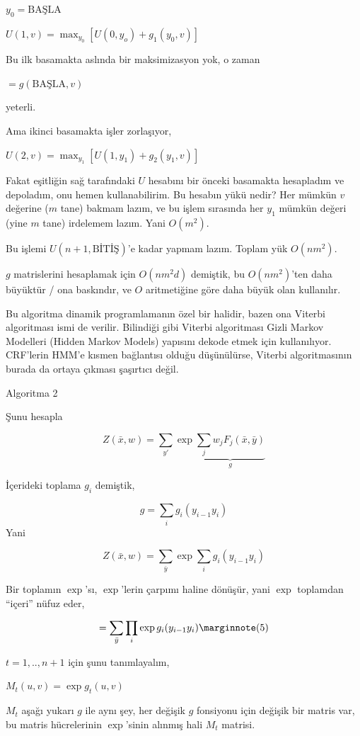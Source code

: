 \documentclass[12pt,fleqn]{article}\usepackage{../../common}
\begin{document}
$y_0 = \textrm{BAŞLA}$

$U(1,v) = \max_{y_0} [ U(0,y_o) + g_1(y_0,v)]$

Bu ilk basamakta aslında bir maksimizasyon yok, o zaman 

$ = g(\textrm{BAŞLA},v)$

yeterli. 

Ama ikinci basamakta işler zorlaşıyor, 

$U(2,v) = \max_{y_1} [ U(1,y_1) + g_2(y_1,v) ]$

Fakat eşitliğin sağ tarafındaki $U$ hesabını bir önceki basamakta
hesapladım ve depoladım, onu hemen kullanabilirim. Bu hesabın yükü nedir? 
Her mümkün $v$ değerine ($m$ tane) bakmam lazım, ve bu işlem sırasında her
$y_1$ mümkün değeri (yine $m$ tane) irdelemem lazım. Yani $O(m^2)$. 

Bu işlemi $U(n+1, \textrm{BİTİŞ})$'e kadar yapmam lazım. Toplam yük $O(nm^2)$. 

$g$ matrislerini hesaplamak için $O(nm^2d)$ demiştik, bu  $O(nm^2)$'ten
daha büyüktür / ona baskındır, ve $O$ aritmetiğine göre daha büyük olan 
kullanılır. 

Bu algoritma dinamik programlamanın özel bir halidir, bazen ona Viterbi
algoritması ismi de verilir. Bilindiği gibi Viterbi algoritması Gizli
Markov Modelleri (Hidden Markov Models) yapısını dekode etmek için
kullanılıyor. CRF'lerin HMM'e kısmen bağlantısı olduğu düşünülürse, Viterbi
algoritmasının burada da ortaya çıkması şaşırtıcı değil. 

Algoritma 2

Şunu hesapla

$$Z(\bar{x},w) = \sum_{y'} \exp 
\underbrace{\sum_j w_j F_j(\bar{x},\bar{y})}_{g}
$$

İçerideki toplama $g_i$ demiştik, 

$$ g = \sum_i g_i(y_{i-1}y_i) $$
Yani

$$
Z(\bar{x},w) = 
\sum_{\bar{y}} \exp 
\sum_i g_i(y_{i-1}y_i) 
$$

Bir toplamın $\exp$'sı, $\exp$'lerin çarpımı haline dönüşür, yani $\exp$
toplamdan ``içeri'' nüfuz eder, 

$$
 = \sum_{\bar{y}} \prod_i \exp  g_i(y_{i-1}y_i) 
\mlabel{5}
$$

$t=1,..,n+1$ için şunu tanımlayalım,

$M_t(u,v) = \exp g_t(u,v)$

$M_t$ aşağı yukarı $g$ ile aynı şey, her değişik $g$ fonsiyonu için değişik
bir matris var, bu matris hücrelerinin $\exp$'sinin alınmış hali $M_t$ matrisi.
\end{document}
